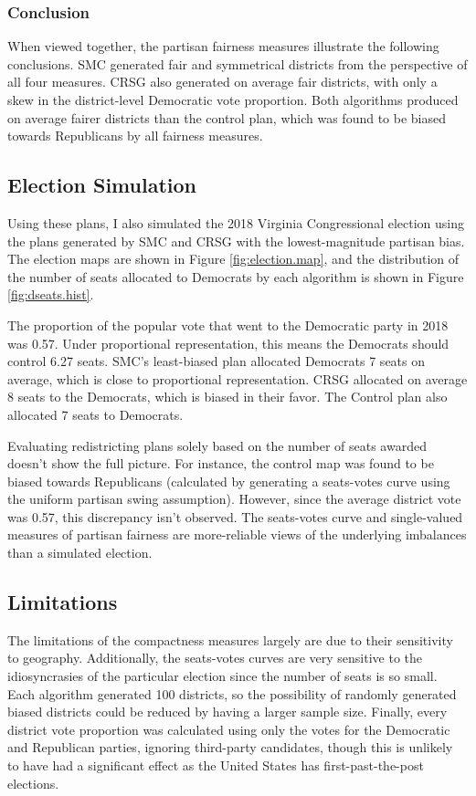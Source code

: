 \subsubsection{Conclusion}

When viewed together, the partisan fairness measures illustrate the following conclusions. SMC generated fair and symmetrical districts from the perspective of all four measures. CRSG also generated on average fair districts, with only a skew in the district-level Democratic vote proportion. Both algorithms produced on average fairer districts than the control plan, which was found to be biased towards Republicans by all fairness measures. 

\subsection{Election Simulation}

Using these plans, I also simulated the 2018 Virginia Congressional election using the plans generated by SMC and CRSG with the lowest-magnitude partisan bias. The election maps are shown in Figure \ref{fig:election.map}, and the distribution of the number of seats allocated to Democrats by each algorithm is shown in Figure \ref{fig:dseats.hist}. 

The proportion of the popular vote that went to the Democratic party in 2018 was 0.57. Under proportional representation, this means the Democrats should control 6.27 seats. SMC's least-biased plan allocated Democrats 7 seats on average, which is close to proportional representation. CRSG allocated on average 8 seats to the Democrats, which is biased in their favor. The Control plan also allocated 7 seats to Democrats. 

Evaluating redistricting plans solely based on the number of seats awarded doesn't show the full picture. For instance, the control map was found to be biased towards Republicans (calculated by generating a seats-votes curve using the uniform partisan swing assumption). However, since the average district vote was 0.57, this discrepancy isn't observed. The seats-votes curve and single-valued measures of partisan fairness are more-reliable views of the underlying imbalances than a simulated election. 

\subsection{Limitations}

The limitations of the compactness measures largely are due to their sensitivity to geography. Additionally, the seats-votes curves are very sensitive to the idiosyncrasies of the particular election since the number of seats is so small. Each algorithm generated 100 districts, so the possibility of randomly generated biased districts could be reduced by having a larger sample size. Finally, every district vote proportion was calculated using only the votes for the Democratic and Republican parties, ignoring third-party candidates, though this is unlikely to have had a significant effect as the United States has first-past-the-post elections. 

